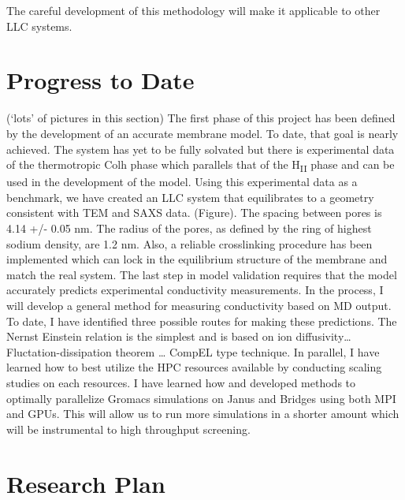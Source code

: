 \documentclass[12pt]{article}
\begin{document}
The careful development of this methodology will make it applicable to other LLC systems.

\section{Progress to Date}

(‘lots’ of pictures in this section)
The first phase of this project has been defined by the development of an accurate membrane model. To date, that goal is nearly achieved. The system has yet to be fully solvated but there is experimental data of the thermotropic Colh phase which parallels that of the H\textsubscript{II} phase and can be used in the development of the model. Using this experimental data as a benchmark, we have created an LLC system that equilibrates to a geometry consistent with TEM and SAXS data. (Figure). The spacing between pores is 4.14 +/- 0.05 nm. The radius of the pores, as defined by the ring of highest sodium density, are 1.2 nm. Also, a reliable crosslinking procedure has been implemented which can lock in the equilibrium structure of the membrane and match the real system.
The last step in model validation requires that the model accurately predicts experimental conductivity measurements. In the process, I will develop a general method for measuring conductivity based on MD output. To date, I have identified three possible routes for making these predictions. The Nernst Einstein relation is the simplest and is based on ion diffusivity… Fluctation-dissipation theorem … CompEL type technique. 
In parallel, I have learned how to best utilize the HPC resources available by conducting scaling studies on each resources. I have learned how and developed methods to optimally parallelize Gromacs simulations on Janus and Bridges using both MPI and GPUs. This will allow us to run more simulations in a shorter amount which will be instrumental to high throughput screening.  

\section{Research Plan}
\end{document}
